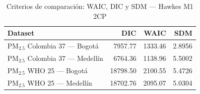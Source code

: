 \begin{table}[htbp]
\centering
\caption{Criterios de comparaci\'{o}n: WAIC, DIC y SDM --- Hawkes M1 2CP}
\label{tab:hawkes_criterios_2cp}
\begin{tabular}{lrrr}
\toprule
Dataset & DIC & WAIC & SDM \\
\midrule
PM$_{2.5}$ Colombia 37 --- Bogot\'{a} & 7957.77 & 1333.46 & 2.8956 \\
PM$_{2.5}$ Colombia 37 --- Medell\'{i}n & 6764.36 & 1138.96 & 5.5002 \\
PM$_{2.5}$ WHO 25 --- Bogot\'{a} & 18798.50 & 2100.55 & 5.4726 \\
PM$_{2.5}$ WHO 25 --- Medell\'{i}n & 18702.76 & 2095.07 & 5.0304 \\
\bottomrule
\end{tabular}
\end{table}

